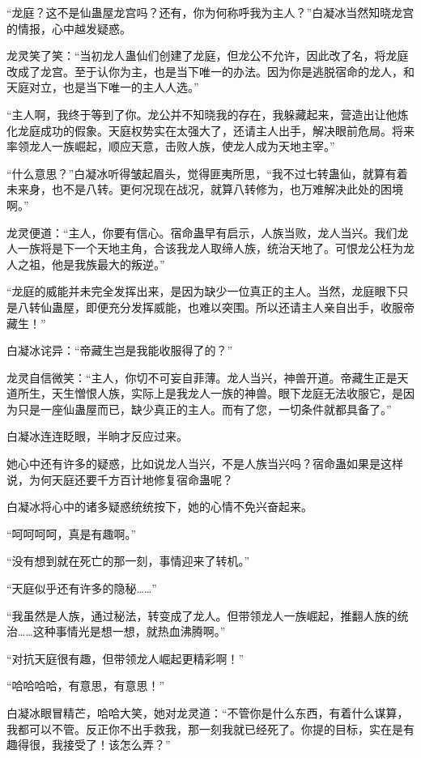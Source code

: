 \begin{this_body}
“龙庭？这不是仙蛊屋龙宫吗？还有，你为何称呼我为主人？”白凝冰当然知晓龙宫的情报，心中越发疑惑。

龙灵笑了笑：“当初龙人蛊仙们创建了龙庭，但龙公不允许，因此改了名，将龙庭改成了龙宫。至于认你为主，也是当下唯一的办法。因为你是逃脱宿命的龙人，和天庭对立，也是当下唯一的主人人选。”

“主人啊，我终于等到了你。龙公并不知晓我的存在，我躲藏起来，营造出让他炼化龙庭成功的假象。天庭权势实在太强大了，还请主人出手，解决眼前危局。将来率领龙人一族崛起，顺应天意，击败人族，使龙人成为天地主宰。”

“什么意思？”白凝冰听得皱起眉头，觉得匪夷所思，“我不过七转蛊仙，就算有着未来身，也不是八转。更何况现在战况，就算八转修为，也万难解决此处的困境啊。”

龙灵便道：“主人，你要有信心。宿命蛊早有启示，人族当败，龙人当兴。我们龙人一族将是下一个天地主角，合该我龙人取缔人族，统治天地了。可恨龙公枉为龙人之祖，他是我族最大的叛逆。”

“龙庭的威能并未完全发挥出来，是因为缺少一位真正的主人。当然，龙庭眼下只是八转仙蛊屋，即便充分发挥威能，也难以突围。所以还请主人亲自出手，收服帝藏生！”

白凝冰诧异：“帝藏生岂是我能收服得了的？”

龙灵自信微笑：“主人，你切不可妄自菲薄。龙人当兴，神兽开道。帝藏生正是天道所生，天生憎恨人族，实际上是我龙人一族的神兽。眼下龙庭无法收服它，是因为只是一座仙蛊屋而已，缺少真正的主人。而有了您，一切条件就都具备了。”

白凝冰连连眨眼，半晌才反应过来。

她心中还有许多的疑惑，比如说龙人当兴，不是人族当兴吗？宿命蛊如果是这样说，为何天庭还要千方百计地修复宿命蛊呢？

白凝冰将心中的诸多疑惑统统按下，她的心情不免兴奋起来。

“呵呵呵呵，真是有趣啊。”

“没有想到就在死亡的那一刻，事情迎来了转机。”

“天庭似乎还有许多的隐秘……”

“我虽然是人族，通过秘法，转变成了龙人。但带领龙人一族崛起，推翻人族的统治……这种事情光是想一想，就热血沸腾啊。”

“对抗天庭很有趣，但带领龙人崛起更精彩啊！”

“哈哈哈哈，有意思，有意思！”

白凝冰眼冒精芒，哈哈大笑，她对龙灵道：“不管你是什么东西，有着什么谋算，我都可以不管。反正你不出手救我，那一刻我就已经死了。你提的目标，实在是有趣得很，我接受了！该怎么弄？”


\end{this_body}
